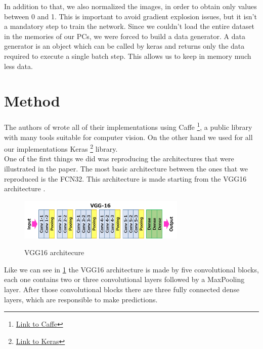 \documentclass[10pt,twocolumn,letterpaper]{article}
\begin{document}
In addition to that, we also normalized the images, in order to obtain only values between 0 and 1. This is important to avoid gradient explosion issues, but it isn't a mandatory step to train the network.
Since we couldn't load the entire dataset in the memories of our PCs, we were forced to build a data generator. A data generator is an object which can be called by keras and returns only the data required to execute a single batch step. This allows us to keep in memory much less data.

\section{Method}

The authors of \cite{projectPaper} wrote all of their implementations using Caffe \footnote{\href{https://caffe.berkeleyvision.org/}{Link to Caffe}}, a public library with many tools suitable for computer vision. On the other hand we used for all our implementations Keras \footnote{\href{https://keras.io/}{Link to Keras}} library. \\
One of the first things we did was reproducing the architectures that were illustrated in the paper. The most basic architecture between the ones that we reproduced is the FCN32. This architecture is made starting from the VGG16 architecture \cite{weights}.
\begin{figure}[t]
	\includegraphics[width=8cm]{image/vgg16}
	\label{vgg}
	\centering
	\caption{VGG16 architecure}
\end{figure}
Like we can see in \ref{vgg} the VGG16 architecture is made by five convolutional blocks, each one contains two or three convolutional layers followed by a MaxPooling layer. After those convolutional blocks there are three fully connected dense layers, which are responsible to make predictions.
\end{document}
